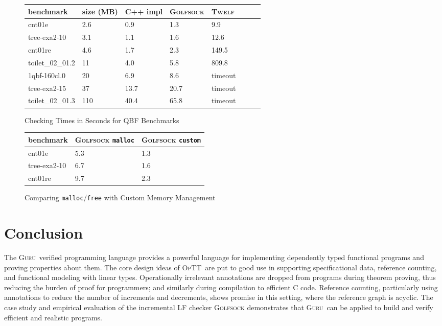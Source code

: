 \documentclass[9pt,natbib]{sigplanconf}
\newcommand{\optt}{\textsc{OpTT}}
\newcommand{\guru}[0]{\textsc{Guru}}
\begin{document}
\begin{figure}
\footnotesize
\begin{center}
\begin{tabular}{|l|l|l|l|l|l|l|l|}
\hline
\textbf{benchmark} & \textbf{size (MB)} & C++ impl & \textsc{Golfsock} & \textsc{Twelf}
\\
\hline
cnt01e
&
2.6
&
0.9
&
1.3
&
9.9 
\\
tree-exa2-10
&
3.1
&
1.1
&
1.6
&
12.6
\\
cnt01re
&
4.6
&
1.7
&
2.3
&
149.5
\\
toilet\_02\_01.2
&
11
&
4.0
&
5.8
&
809.8
\\
1qbf-160cl.0
&
20
&
6.9
&
8.6
&
timeout
\\
tree-exa2-15
&
37
&
13.7
&
20.7
&
timeout 
\\
toilet\_02\_01.3
&
110
&
40.4
&
65.8
&
timeout
\\
\hline
\end{tabular}
\end{center}
\caption{\label{fig:qbf}Checking Times in Seconds for QBF Benchmarks}
\end{figure}


\begin{figure}
\footnotesize
\begin{center}
\begin{tabular}{|l|l|l|}
\hline
\textbf{benchmark} & \textsc{Golfsock} \texttt{malloc} & \textsc{Golfsock} \texttt{custom}
\\
\hline
cnt01e
&
5.3
&
1.3
\\
tree-exa2-10
&
6.7
&
1.6
\\
cnt01re
&
9.7
&
2.3
\\
\hline
\end{tabular}
\end{center}
\caption{\label{fig:qbf2}Comparing \texttt{malloc}/\texttt{free} with Custom Memory Management}
\end{figure}

\section{Conclusion}

The \guru\ verified programming language provides a powerful language
for implementing dependently typed functional programs and proving
properties about them.  The core design ideas of \optt\ are put to
good use in supporting specificational data, reference counting, and
functional modeling with linear types.  Operationally irrelevant
annotations are dropped from programs during theorem proving, thus
reducing the burden of proof for programmers; and similarly during
compilation to efficient C code.  Reference counting, particularly
using annotations to reduce the number of increments and decrements,
shows promise in this setting, where the reference graph is acyclic.
The case study and empirical evaluation of the incremental LF checker
\textsc{Golfsock} demonstrates that \guru\ can be applied to build and
verify efficient and realistic programs.
\end{document}

